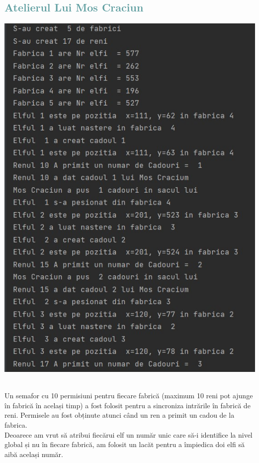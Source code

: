 \documentclass{article}
\begin{document}
\subsection{\textcolor{CadetBlue}{Atelierul Lui Mos Craciun}}
\begin{center}
    \textbf{\includegraphics[scale=0.8]{1.jpg}}
\end{center}\\
Un semafor cu 10 permisiuni pentru fiecare fabrică (maximum 10 reni pot ajunge în fabrică în același timp) a fost folosit pentru a sincroniza intrările în fabrică de reni. Permisele au fost obținute atunci când un ren a primit un cadou de la fabrica.\\

Deoarece am vrut să atribui fiecărui elf un număr unic care să-i identifice la nivel global și nu în fiecare fabrică, am folosit un lacăt pentru a împiedica doi elfi să aibă același număr.\\
\end{document}
